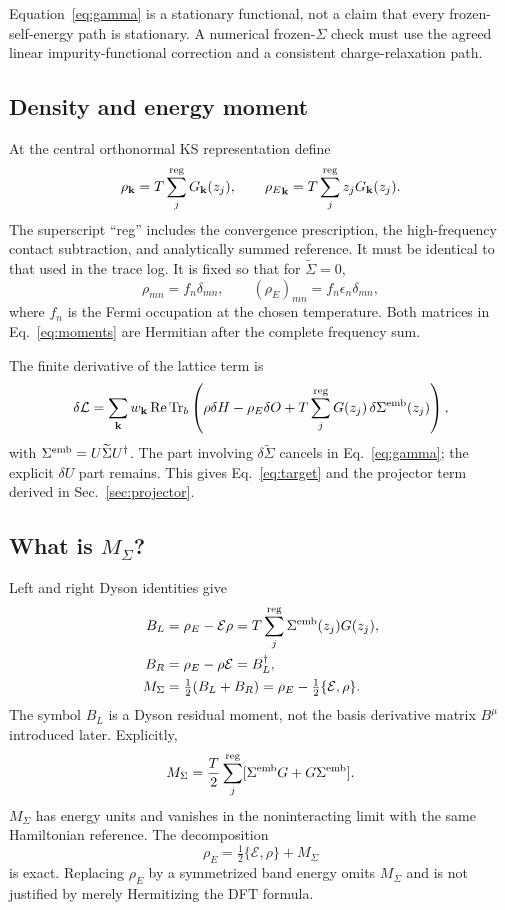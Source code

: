 \documentclass[11pt]{article}
\newcommand{\Tr}{\operatorname{Tr}}
\newcommand{\Rea}{\operatorname{Re}}
\newcommand{\kb}{\mathbf k}
\newcommand{\Es}{\mathcal E}
\newcommand{\Sig}{\widetilde\Sigma}
\newcommand{\rE}{{\rho_E}}
\newcommand{\note}[2]{\par\medskip\noindent\colorbox{#1}{\parbox{\dimexpr\linewidth-2\fboxsep\relax}{#2}}\par\medskip}
\newcommand{\caution}[1]{\note{amber}{#1}}
\begin{document}
\caution{Equation~\eqref{eq:gamma} is a stationary functional, not a claim
that every frozen-self-energy path is stationary. A numerical frozen-$\Sigma$
check must use the agreed linear impurity-functional correction and a
consistent charge-relaxation path.}

\subsection{Density and energy moment}
At the central orthonormal KS representation define
\begin{equation}
 \rho_\kb=T\sum_j^{\rm reg}G_\kb(z_j),\qquad
 \rE_\kb=T\sum_j^{\rm reg}z_jG_\kb(z_j).
 \label{eq:moments}
\end{equation}
The superscript ``reg'' includes the convergence prescription, the
high-frequency contact subtraction, and analytically summed reference.
It must be identical to that used in the trace log. It is fixed so that
for $\Sig=0$,
\begin{equation}
 \rho_{mn}=f_n\delta_{mn},\qquad
 (\rE)_{mn}=f_n\epsilon_n\delta_{mn},
 \label{eq:dftmoments}
\end{equation}
where $f_n$ is the Fermi occupation at the chosen temperature.
Both matrices in Eq.~\eqref{eq:moments} are Hermitian after the complete
frequency sum.

The finite derivative of the lattice term is
\begin{equation}
 \delta\mathcal L=\sum_\kb w_\kb\Rea\Tr_b
 \left(\rho\delta H-\rE\delta O
       +T\sum_j^{\rm reg}G(z_j)\,\delta\Sigma^{\rm emb}(z_j)\right),
 \label{eq:logderiv}
\end{equation}
with $\Sigma^{\rm emb}=U\Sig U^\dagger$. The part involving
$\delta\Sig$ cancels in Eq.~\eqref{eq:gamma}; the explicit $\delta U$
part remains. This gives Eq.~\eqref{eq:target} and the projector term
derived in Sec.~\ref{sec:projector}.

\subsection{What is \texorpdfstring{$M_\Sigma$}{M-Sigma}?}
Left and right Dyson identities give
\begin{align}
 B_L&=\rE-\Es\rho
     =T\sum_j^{\rm reg}\Sigma^{\rm emb}(z_j)G(z_j),\\
 B_R&=\rE-\rho\Es=B_L^\dagger,\\
 M_\Sigma&=\tfrac12(B_L+B_R)
   =\rE-\tfrac12\{\Es,\rho\}.
 \label{eq:msigma}
\end{align}
The symbol $B_L$ is a Dyson residual moment, not the basis derivative
matrix $B^\mu$ introduced later. Explicitly,
\begin{equation}
 M_\Sigma=\frac T2\sum_j^{\rm reg}
       [\Sigma^{\rm emb}G+G\Sigma^{\rm emb}].
\end{equation}
$M_\Sigma$ has energy units and vanishes in the noninteracting limit
with the same Hamiltonian reference. The decomposition
\begin{equation}
 \rE=\tfrac12\{\Es,\rho\}+M_\Sigma
 \label{eq:momentdecomp}
\end{equation}
is exact. Replacing $\rho_E$ by a symmetrized band energy omits
$M_\Sigma$ and is not justified by merely Hermitizing the DFT formula.
\end{document}
